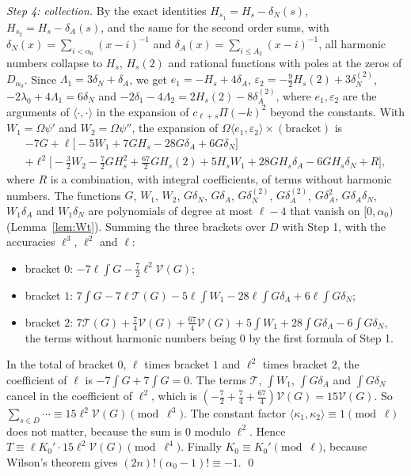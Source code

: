 \documentclass[11pt]{amsart}
\theoremstyle{definition}
\theoremstyle{remark}
\numberwithin{equation}{section}
\begin{document}
\emph{Step 4: collection.} By the exact identities $H_{s_1}=H_s-\delta_N(s)$, $H_{s_2}=H_s-\delta_A(s)$, and the same for the second order sums, with
$\delta_N(x)=\sum_{i<\alpha_0}(x-i)^{-1}$ and $\delta_A(x)=\sum_{i\le A_2}(x-i)^{-1}$, all harmonic numbers collapse to $H_s$, $H_s(2)$ and
rational functions with poles at the zeros of $D_{\alpha_0}$. Since $\Lambda_1=3\delta_N+\delta_A$, we get
$e_1=-H_s+4\delta_A$, $\varepsilon_2=-\frac92H_s(2)+3\delta_N^{(2)}$, $-2\lambda_0+4\Lambda_1=6\delta_N$ and $-2\delta_1-4\Lambda_2=2H_s(2)-8\delta_A^{(2)}$,
where $e_1,\varepsilon_2$ are the arguments of $\langle\cdot,\cdot\rangle$ in the expansion of $c_{\ell+s}\Pi(-k)^2$ beyond the constants. With
$W_1=\Omega\psi'$ and $W_2=\Omega\psi''$, the expansion of $\Omega\langle e_1,\varepsilon_2\rangle\times(\text{bracket})$ is
\begin{multline*}
 -7G+\ell\bigl[-5W_1+7GH_s-28G\delta_A+6G\delta_N\bigr]\\
 +\ell^2\bigl[-\tfrac32W_2-\tfrac72GH_s^2+\tfrac{67}2GH_s(2)+5H_sW_1+28GH_s\delta_A-6GH_s\delta_N+R\bigr],
\end{multline*}
where $R$ is a combination, with integral coefficients, of terms without harmonic numbers. The functions $G$, $W_1$, $W_2$, $G\delta_N$, $G\delta_A$, $G\delta_N^{(2)}$,
$G\delta_A^{(2)}$, $G\delta_A^2$, $G\delta_A\delta_N$, $W_1\delta_A$ and $W_1\delta_N$ are polynomials of degree at most $\ell-4$ that vanish on $[0,\alpha_0)$
(Lemma~\ref{lem:Wt}). Summing the three brackets over $D$ with Step 1, with the accuracies $\ell^3$, $\ell^2$ and $\ell$:
\begin{itemize}
\item bracket $0$: $-7\ell\int G-\frac72\ell^2\mathcal V(G)$;
\item bracket $1$: $7\int G-7\ell\mathcal T(G)-5\ell\int W_1-28\ell\int G\delta_A+6\ell\int G\delta_N$;
\item bracket $2$: $7\mathcal T(G)+\frac74\mathcal V(G)+\frac{67}4\mathcal V(G)+5\int W_1+28\int G\delta_A-6\int G\delta_N$, the terms without harmonic numbers being $0$ by the first formula of Step 1.
\end{itemize}
In the total of bracket $0$, $\ell$ times bracket $1$ and $\ell^2$ times bracket $2$, the coefficient of $\ell$ is $-7\int G+7\int G=0$. The terms $\mathcal T$, $\int W_1$, $\int G\delta_A$ and $\int G\delta_N$ cancel in the coefficient of $\ell^2$, which is
$(-\frac72+\frac74+\frac{67}4)\mathcal V(G)=15\mathcal V(G)$. So $\sum_{s\in D}\cdots\equiv15\ell^2\mathcal V(G)\pmod{\ell^3}$. The constant factor $\langle\kappa_1,\kappa_2\rangle\equiv1\pmod\ell$ does not matter, because the sum is $0$ modulo $\ell^2$. Hence
$T\equiv\ell K_0'\cdot15\ell^2\mathcal V(G)\pmod{\ell^4}$. Finally $K_0\equiv K_0'\pmod\ell$, because Wilson's theorem gives $(2n)!(\alpha_0-1)!\equiv-1$. \qed
\end{document}
